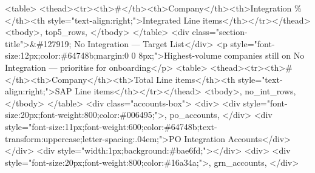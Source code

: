 \documentclass[
]{article}
\newenvironment{Shaded}{\begin{snugshade}}{\end{snugshade}}
\newcommand{\NormalTok}[1]{#1}
\newcommand{\StringTok}[1]{\textcolor[rgb]{0.31,0.60,0.02}{#1}}
\begin{document}
\begin{Shaded}
\begin{Highlighting}[]
\StringTok{    \textless{}table\textgreater{}}
\StringTok{      \textless{}thead\textgreater{}\textless{}tr\textgreater{}\textless{}th\textgreater{}\#\textless{}/th\textgreater{}\textless{}th\textgreater{}Company\textless{}/th\textgreater{}\textless{}th\textgreater{}Integration \%\textless{}/th\textgreater{}\textless{}th style="text{-}align:right;"\textgreater{}Integrated Line items\textless{}/th\textgreater{}\textless{}/tr\textgreater{}\textless{}/thead\textgreater{}}
\StringTok{      \textless{}tbody\textgreater{}\textquotesingle{}}\NormalTok{, top5\_rows, }\StringTok{\textquotesingle{}\textless{}/tbody\textgreater{}}
\StringTok{    \textless{}/table\textgreater{}}
\StringTok{    \textless{}div class="section{-}title"\textgreater{}\&\#127919; No Integration — Target List\textless{}/div\textgreater{}}
\StringTok{    \textless{}p style="font{-}size:12px;color:\#64748b;margin:0 0 8px;"\textgreater{}Highest{-}volume companies still on No Integration — prioritise for onboarding\textless{}/p\textgreater{}}
\StringTok{    \textless{}table\textgreater{}}
\StringTok{      \textless{}thead\textgreater{}\textless{}tr\textgreater{}\textless{}th\textgreater{}\#\textless{}/th\textgreater{}\textless{}th\textgreater{}Company\textless{}/th\textgreater{}\textless{}th\textgreater{}Total Line items\textless{}/th\textgreater{}\textless{}th style="text{-}align:right;"\textgreater{}SAP Line items\textless{}/th\textgreater{}\textless{}/tr\textgreater{}\textless{}/thead\textgreater{}}
\StringTok{      \textless{}tbody\textgreater{}\textquotesingle{}}\NormalTok{, no\_int\_rows, }\StringTok{\textquotesingle{}\textless{}/tbody\textgreater{}}
\StringTok{    \textless{}/table\textgreater{}}
\StringTok{    \textless{}div class="accounts{-}box"\textgreater{}}
\StringTok{      \textless{}div\textgreater{}}
\StringTok{        \textless{}div style="font{-}size:20px;font{-}weight:800;color:\#006495;"\textgreater{}\textquotesingle{}}\NormalTok{, po\_accounts, }\StringTok{\textquotesingle{}\textless{}/div\textgreater{}}
\StringTok{        \textless{}div style="font{-}size:11px;font{-}weight:600;color:\#64748b;text{-}transform:uppercase;letter{-}spacing:.04em;"\textgreater{}PO Integration Accounts\textless{}/div\textgreater{}}
\StringTok{      \textless{}/div\textgreater{}}
\StringTok{      \textless{}div style="width:1px;background:\#bae6fd;"\textgreater{}\textless{}/div\textgreater{}}
\StringTok{      \textless{}div\textgreater{}}
\StringTok{        \textless{}div style="font{-}size:20px;font{-}weight:800;color:\#16a34a;"\textgreater{}\textquotesingle{}}\NormalTok{, grn\_accounts, }\StringTok{\textquotesingle{}\textless{}/div\textgreater{}}

\end{Highlighting}
\end{Shaded}
\end{document}
